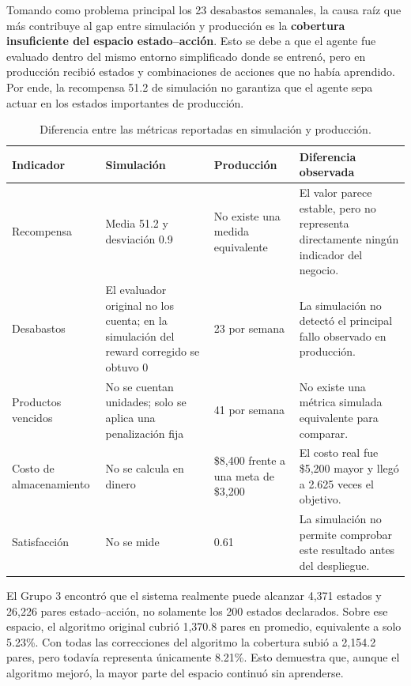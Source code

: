 \documentclass[11pt,letterpaper]{article}
\begin{document}
Tomando como problema principal los 23 desabastos semanales, la causa raíz que
más contribuye al gap entre simulación y producción es la \textbf{cobertura
insuficiente del espacio estado--acción}. Esto se debe a que el agente fue
evaluado dentro del mismo entorno simplificado donde se entrenó, pero en
producción recibió estados y combinaciones de acciones que no había aprendido.
Por ende, la recompensa 51.2 de simulación no garantiza que el agente sepa actuar
en los estados importantes de producción.

\begin{table}[h]
\centering
\small
\begin{tabular}{p{3.1cm}p{3.7cm}p{3.7cm}p{5.1cm}}
\toprule
\textbf{Indicador} & \textbf{Simulación} & \textbf{Producción} &
\textbf{Diferencia observada} \\
\midrule
Recompensa & Media 51.2 y desviación 0.9 & No existe una medida equivalente &
El valor parece estable, pero no representa directamente ningún indicador del
negocio. \\
\addlinespace
Desabastos & El evaluador original no los cuenta; en la simulación del reward
corregido se obtuvo 0 & 23 por semana & La simulación no detectó el principal
fallo observado en producción. \\
\addlinespace
Productos vencidos & No se cuentan unidades; solo se aplica una penalización
fija & 41 por semana & No existe una métrica simulada equivalente para comparar. \\
\addlinespace
Costo de almacenamiento & No se calcula en dinero & \$8,400 frente a una meta
de \$3,200 & El costo real fue \$5,200 mayor y llegó a 2.625 veces el objetivo. \\
\addlinespace
Satisfacción & No se mide & 0.61 & La simulación no permite comprobar este
resultado antes del despliegue. \\
\bottomrule
\end{tabular}
\caption{Diferencia entre las métricas reportadas en simulación y producción.}
\label{tab:gap-simulacion-produccion}
\end{table}

El Grupo 3 encontró que el sistema realmente puede alcanzar 4,371 estados y
26,226 pares estado--acción, no solamente los 200 estados declarados. Sobre ese
espacio, el algoritmo original cubrió 1,370.8 pares en promedio, equivalente a
solo 5.23\%. Con todas las correcciones del algoritmo la cobertura subió a
2,154.2 pares, pero todavía representa únicamente 8.21\%. Esto demuestra que,
aunque el algoritmo mejoró, la mayor parte del espacio continuó sin aprenderse.
\end{document}
